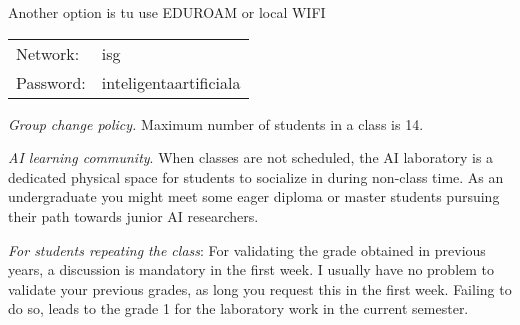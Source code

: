 \begin{enumerate}
\begin{center}
\item Another option is tu use EDUROAM or local WIFI

\begin{tabular}{ll}
Network: & isg\\
Password: & inteligentaartificiala\\
\end{tabular}
\end{center}

\item {\it Group change policy.} Maximum number of students in a class is 14.

\item {\it AI learning community}. When classes are not scheduled, the AI laboratory is a dedicated physical space for students to socialize in during non-class time. As an undergraduate you might meet some eager diploma or master students pursuing their path towards junior AI researchers.

\item {\it For students repeating the class}: 
For validating the grade obtained in previous years, a discussion is mandatory in the first week. 
I usually have no problem to validate your previous grades, as long you request this in the first week. 
Failing to do so, leads to the grade 1 for the laboratory work in the current semester.


\end{enumerate}





